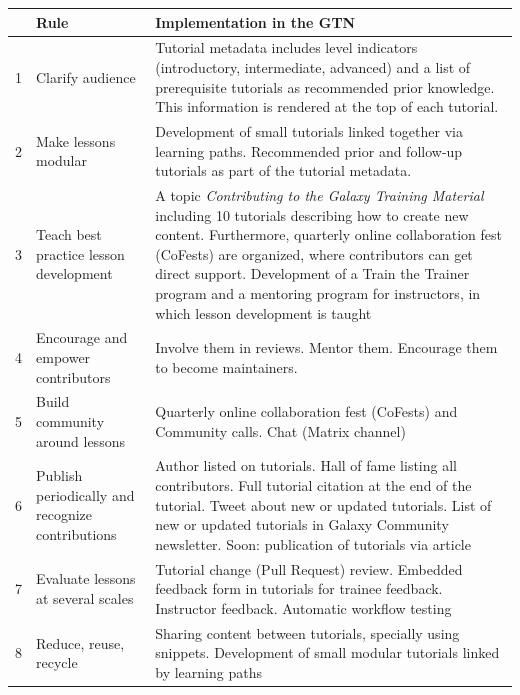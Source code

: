 \begin{table}[h!t]
    \footnotesize
	\centering
	\begin{tabular}{|l|p{}|p{}|}
	     \hline
		   & \textbf{Rule}                                      & \textbf{Implementation in the GTN}\\\hline
		1  & {\raggedright Clarify audience}                                 & Tutorial metadata includes level indicators (introductory, intermediate, advanced) and a list of prerequisite tutorials as recommended prior knowledge. This information is rendered at the top of each tutorial. \\
		2  & {\raggedright Make lessons modular}                             & Development of small tutorials linked together via learning paths. Recommended prior and follow-up tutorials as part of the tutorial metadata.  \\
		3  & {\raggedright Teach best practice lesson development}           & A topic \emph{Contributing to the Galaxy Training Material} including 10 tutorials describing how to create new content. Furthermore, quarterly online collaboration fest (CoFests) are organized, where contributors can get direct support. Development of a Train the Trainer program and a mentoring program for instructors, in which lesson development is taught \\
		4  & {\raggedright Encourage and empower contributors}               & Involve them in reviews. Mentor them. Encourage them to become maintainers. \\
		5  & {\raggedright Build community around lessons}                   & Quarterly online collaboration fest (CoFests) and Community calls. Chat (Matrix channel) \\
		6  & {\raggedright Publish periodically and recognize contributions} & Author listed on tutorials. Hall of fame listing all contributors. Full tutorial citation at the end of the tutorial. Tweet about new or updated tutorials. List of new or updated tutorials in Galaxy Community newsletter. Soon: publication of tutorials via article \\
		7  & {\raggedright Evaluate lessons at several scales}               & Tutorial change (Pull Request) review. Embedded feedback form in tutorials for trainee feedback. Instructor feedback. Automatic workflow testing \\
		8  & {\raggedright Reduce, reuse, recycle}                           & Sharing content between tutorials, specially using snippets. Development of small modular tutorials linked by learning paths \\

\end{tabular}
\end{table}
